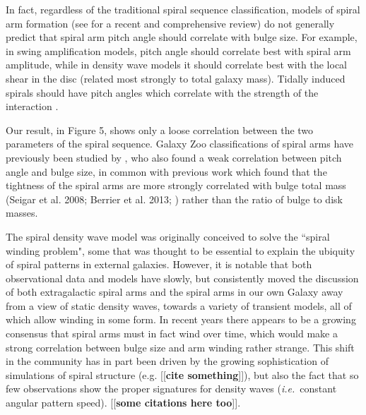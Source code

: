 \documentclass[usenatbib]{mn2e}
\newcommand{\ie}{{\it i.e.}}
\newcommand{\comment}[2][todo]{{\color{#1}[[{\bf #2}]]}}
\begin{document}
 In fact, regardless of the traditional spiral sequence classification, models of spiral arm formation (see \citealt{DobbsBaba2014} for a recent and comprehensive review) do not generally predict that spiral arm pitch angle should correlate with bulge size. For example, in swing amplification models, pitch angle should correlate best with spiral arm amplitude, while in density wave models it should correlate best with the local shear in the disc (related most strongly to total galaxy mass). Tidally induced spirals should have pitch angles which correlate with the strength of the interaction \citep{Kendall2011}. %
 
 Our result, in Figure 5, shows only a loose correlation between the two parameters of the spiral sequence. Galaxy Zoo classifications of spiral arms have previously been studied by \citet{Hart2017b}, who also found a weak correlation between pitch angle and bulge size, in common with previous work which found that the tightness of the spiral arms are more strongly correlated with bulge total mass (Seigar et al. 2008; Berrier et al. 2013; \citealt{Davis2015}) rather than the ratio of bulge to disk masses. %

% 



The spiral density wave model \citep{LinShu1964} was originally conceived to solve the ``spiral winding problem", some that was thought to be essential to explain the ubiquity of spiral patterns in external galaxies. However, it is notable that both observational data and models have slowly, but consistently moved the discussion of both extragalactic spiral arms \citep{2013ApJ...766...34D} and the spiral arms in our own Galaxy \citep{hunt2018} away from a view of static density waves, towards a variety of transient models, all of which allow winding in some form. In recent years there appears to be a growing consensus that spiral arms must in fact wind over time, which would make a strong correlation between bulge size and arm winding rather strange. This shift in the community has in part been driven by the growing sophistication of simulations of spiral structure (e.g. \comment{cite something}), but also the fact that so few observations show the proper signatures for density waves (\ie ~constant angular pattern speed). \comment{some citations here too}. 
\end{document}
